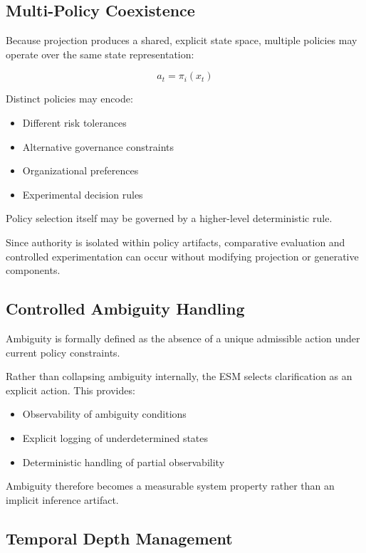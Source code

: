 \documentclass[11pt]{article}
\begin{document}
\subsection{Multi-Policy Coexistence}

Because projection produces a shared, explicit state space, multiple policies may operate over the same state representation:

\[
a_t = \pi_i(x_t)
\]

Distinct policies may encode:

\begin{itemize}
  \item Different risk tolerances
  \item Alternative governance constraints
  \item Organizational preferences
  \item Experimental decision rules
\end{itemize}

Policy selection itself may be governed by a higher-level deterministic rule.

Since authority is isolated within policy artifacts, comparative evaluation and controlled experimentation can occur without modifying projection or generative components.


\subsection{Controlled Ambiguity Handling}

Ambiguity is formally defined as the absence of a unique admissible action under current policy constraints.

Rather than collapsing ambiguity internally, the ESM selects clarification as an explicit action. This provides:

\begin{itemize}
  \item Observability of ambiguity conditions
  \item Explicit logging of underdetermined states
  \item Deterministic handling of partial observability
\end{itemize}

Ambiguity therefore becomes a measurable system property rather than an implicit inference artifact.


\subsection{Temporal Depth Management}
\end{document}
